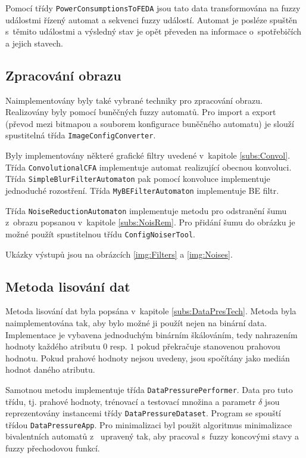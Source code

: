 Pomocí třídy \verb|PowerConsumptionsToFEDA| jsou tato data transformována na fuzzy událostmi řízený automat a sekvenci fuzzy událostí. Automat je posléze spuštěn s~těmito událostmi a výsledný stav je opět převeden na informace o~spotřebičích a jejich stavech. 

\subsection{Zpracování obrazu}
Naimplementovány byly také vybrané techniky pro zpracování obrazu. Realizovány byly pomocí buněčných fuzzy automatů. Pro import a export (převod mezi bitmapou a souborem konfigurace buněčného automatu) je slouží spustitelná třída \verb|ImageConfigConverter|.

Byly implementovány některé grafické filtry uvedené v~kapitole \ref{subs:Convol}. Třída \verb|ConvolutionalCFA| implementuje automat realizující obecnou konvoluci. Třída \verb|SimpleBlurFilterAutomaton| pak pomocí konvoluce implementuje jednoduché rozostření. Třída \verb|MyBEFilterAutomaton| implementuje BE filtr. 

Třída \verb|NoiseReductionAutomaton| implementuje metodu pro odstranění šumu z~obrazu popsanou v~kapitole \ref{subs:NoisRem}. Pro přidání šumu do obrázku je možné použít spustitelnou třídu \verb|ConfigNoiserTool|.

Ukázky výstupů jsou na obrázcích \ref{img:Filters} a \ref{img:Noises}.

\subsection{Metoda lisování dat} \label{subs:DataPresImpl}

Metoda lisování dat byla popsána v~kapitole \ref{subs:DataPresTech}. Metoda byla naimplementována tak, aby bylo možné ji použít nejen na binární data. Implementace je vybavena jednoduchým binárním škálováním, tedy nahrazením hodnoty každého atributu $0$ resp. $1$ pokud překračuje stanovenou prahovou hodnotu. Pokud prahové hodnoty nejsou uvedeny, jsou spočítány jako medián hodnot daného atributu.

Samotnou metodu implementuje třída \verb|DataPressurePerformer|. Data pro tuto třídu, tj. prahové hodnoty, trénovací a testovací množina a parametr $\delta$ jsou reprezentovány instancemi třídy \verb|DataPressureDataset|. Program se spouští třídou \verb|DataPressureApp|. Pro minimalizaci byl použit algoritmus minimalizace bivalentních automatů z~\cite{Koz-AutComp} upravený tak, aby pracoval s~fuzzy koncovými stavy a fuzzy přechodovou funkcí.


